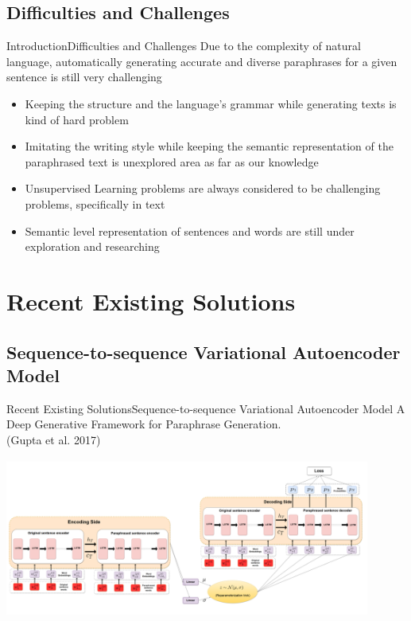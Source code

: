 \documentclass[10pt]{beamer}
\begin{document}
\subsection{Difficulties and Challenges}
	\begin{frame}{Introduction}{Difficulties and Challenges}
    Due to the complexity of natural language, automatically generating accurate and diverse paraphrases for a given sentence is still very challenging \\
		\begin{itemize}
			\item<1-> Keeping the structure and the language's grammar while generating texts is kind of hard problem
            \item<1-> Imitating the writing style while keeping the semantic representation of the paraphrased text is unexplored area as far as our knowledge
            \item<1-> Unsupervised Learning problems are always considered to be challenging problems, specifically in text
            \item<1-> Semantic level representation of sentences and words are still under exploration and researching
		\end{itemize}
	\end{frame}


\section{Recent Existing Solutions}
\subsection{Sequence-to-sequence Variational Autoencoder Model}
\begin{frame}{Recent Existing Solutions}{Sequence-to-sequence Variational Autoencoder Model}
\centering
A Deep Generative Framework for Paraphrase Generation. \\
(Gupta et al. 2017)
\centering
\includegraphics[width=12cm, height=6cm]{A_Deep_Framework_for_Text_Paraphrasing.png}
\end{frame}
\end{document}
